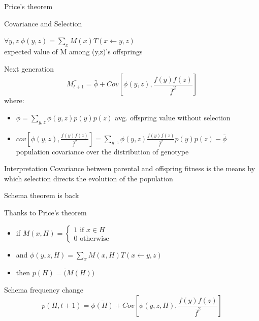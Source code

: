 \begin{frame}{Price's theorem}
  \begin{block}{Covariance and Selection}
    \begin{center}
      $\forall y,z \; \phi(y,z) = \sum\limits_{x} M(x)T(x \leftarrow y,z)$\\ expected value of M among (y,z)'s offsprings
      \end{center}
  \end{block}

  \begin{block}{Next generation}
    $$\bar{M_{t+1}} = \bar{\phi}
    + Cov[\phi(y,z), \frac{f(y)f(z)}{\bar{f}^2}]$$
    where:
    \begin{itemize}
    \item $\bar{\phi} = \sum\limits_{y,z} \phi(y,z)p(y)p(z)$ avg. offspring value without selection
    \item $cov[\phi(y,z), \frac{f(y)f(z)}{\bar{f}^2}] =
      \sum\limits_{y,z} \phi(y,z) \frac{f(y)f(z)}{\bar{f}^2}p(y)p(z) -
      \bar{\phi}$ population covariance over the distribution of genotype
    \end{itemize}
  \end{block}

  \begin{block}{Interpretation}
    Covariance between parental and offspring fitness is the means by which selection directs the evolution of the population
  \end{block}
\end{frame}

\begin{frame}{Schema theorem is back}
  \begin{block}{Thanks to Price's theorem}
    \begin{itemize}
      \item if $M(x, H) = \left\{\begin{array}{l}
        1 \text{ if } x \in H\\
        0 \text{ otherwise}
        \end{array}
        \right .$
      \item and $\phi(y,z,H) = \sum\limits_{x} M(x,H)T(x \leftarrow y,z)$
      \item then $p(H) = \bar(M(H))$
    \end{itemize}
  \end{block}

  \begin{block}{Schema frequency change\cite{Altenberg95}}
    $$p(H,t+1) = \bar{\phi(H)} + Cov[\phi(y,z,H), \frac{f(y)f(z)}{\bar{f}^2}]$$
  \end{block}

\end{frame}

